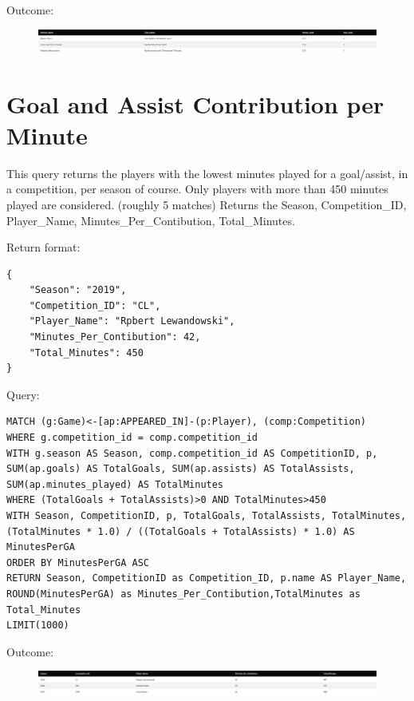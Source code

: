 \documentclass{Configuration_Files/PoliMi3i_thesis}
\begin{document}
Outcome:
\begin{figure}[H]
    \centering
    \includegraphics[width=\linewidth]{Project Template/Images/query_output/q8.png}
\end{figure}






\section{Goal and Assist Contribution per Minute}
This query returns the players with the lowest minutes played for a goal/assist, in a competition, per season of course.
Only players with more than 450 minutes played are considered. (roughly 5 matches)
Returns the Season, Competition\_ID, Player\_Name, Minutes\_Per\_Contibution, Total\_Minutes.

Return format:
\begin{lstlisting}[style=json]
{
    "Season": "2019",
    "Competition_ID": "CL",
    "Player_Name": "Rpbert Lewandowski",
    "Minutes_Per_Contibution": 42,
    "Total_Minutes": 450
}
\end{lstlisting}


Query:

\begin{lstlisting}[language=Cypher]
MATCH (g:Game)<-[ap:APPEARED_IN]-(p:Player), (comp:Competition)
WHERE g.competition_id = comp.competition_id
WITH g.season AS Season, comp.competition_id AS CompetitionID, p, SUM(ap.goals) AS TotalGoals, SUM(ap.assists) AS TotalAssists, SUM(ap.minutes_played) AS TotalMinutes
WHERE (TotalGoals + TotalAssists)>0 AND TotalMinutes>450
WITH Season, CompetitionID, p, TotalGoals, TotalAssists, TotalMinutes, (TotalMinutes * 1.0) / ((TotalGoals + TotalAssists) * 1.0) AS MinutesPerGA
ORDER BY MinutesPerGA ASC
RETURN Season, CompetitionID as Competition_ID, p.name AS Player_Name, ROUND(MinutesPerGA) as Minutes_Per_Contibution,TotalMinutes as Total_Minutes
LIMIT(1000)
\end{lstlisting}


Outcome:
\begin{figure}[H]
    \centering
    \includegraphics[width=\linewidth]{Project Template/Images/query_output/q9.png}
\end{figure}
\end{document}
